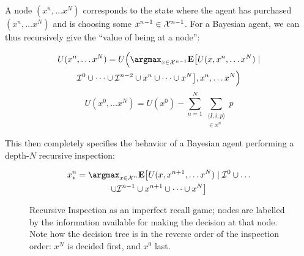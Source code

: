 A node $(x^n,\dots x^N)$ corresponds to the state where the agent has purchased $(x^n,\dots x^N)$ and is choosing some $x^{n-1}\in\mathcal{X}^{n-1}$. For a Bayesian agent, we can thus recursively give the ``value of being at a node'':

\begin{multline}
  U(x^n,\dots x^N) = U\Big(
    \argmax_{x\in\Actions^{n-1}}
    \Expect\bigl[
      U(x,x^n,\dots x^N) \mid \\
      \infooffers^0\cup\dots\cup\infooffers^{n-2}\cup
      x^n\cup\dots\cup x^N
    \bigr],
    x^n,\dots x^N
  \Big)
  \label{eq:imperfect-u}
\end{multline}
\begin{equation}
  U(x^0,\dots x^N) = U(x^0) - \sum_{n=1}^N \sum_{\substack{\langle I, i, p\rangle \\ \in x^n}} p
  \label{eq:imperfect-u0}
\end{equation}

This then completely specifies the behavior of a Bayesian agent performing a depth-$N$ recursive inspection:

\begin{multline}
  x^n_*=\argmax_{x\in\Actions^n}\Expect\bigl[
      U(x,x^{n+1},\dots x^N) \mid
      \infooffers^0\cup\dots \\
      \cup\infooffers^{n-1}\cup
      x^{n+1}\cup\dots\cup x^N
  \bigr]
  \label{eq:imperfect-x}
\end{multline}

\begin{figure}
  \centering
  \resizebox{\columnwidth}{!}{
  
  }
  \caption{Recursive Inspection as an imperfect recall game; nodes are labelled by the information available for making the decision at that node. Note how the decision tree is in the reverse order of the inspection order: $x^N$ is decided first, and $x^0$ last.}
  \label{fig:imperfect}
\end{figure}






